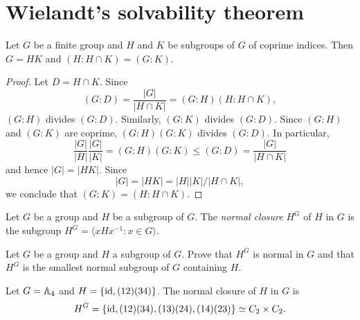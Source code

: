 
\section{Wielandt's solvability theorem}

\begin{lemma}
	\label{lemma:4Wielandt}
	Let $G$ be a finite group and $H$ and $K$ be subgroups of $G$ 
        of coprime indices. Then $G=HK$ and $(H:H\cap K)=(G:K)$.
\end{lemma}

\begin{proof}
	Let $D=H\cap K$. Since 
	\[
	(G:D)=\frac{|G|}{|H\cap K|}=(G:H)(H:H\cap K),
	\]
	$(G:H)$ divides $(G:D)$. Similarly, $(G:K)$ divides 
	$(G:D)$. Since $(G:H)$ and $(G:K)$ are coprime, $(G:H)(G:K)$
	divides $(G:D)$. In particular, 
	\[
	\frac{|G|}{|H|}\frac{|G|}{|K|}=(G:H)(G:K)\leq (G:D)=\frac{|G|}{|H\cap K|} 
	\]
	and hence $|G|=|HK|$. Since 
 \[
 |G|=|HK|=|H||K|/|H\cap K|,
 \]
 we conclude that 
	$(G:K)=(H:H\cap K)$.
\end{proof}

\begin{definition}
Let $G$ be a group and $H$ be a subgroup of $G$. The 
\emph{normal closure} $H^G$ of $H$ in $G$ is the subgroup 
$H^G=\langle xHx^{-1}:x\in G\rangle$.
\end{definition}

\begin{exercise}
Let $G$ be a group and $H$ a subgroup of $G$. Prove that $H^G$ is normal in $G$ and that 
$H^G$ is the smallest normal subgroup of $G$ containing $H$. 
\end{exercise}


\begin{example}
Let $G=\mathbb{A}_4$ and $H=\{\operatorname{id},(12)(34)\}$. The normal closure of $H$ in $G$
is 
 \[
 H^G=\{\operatorname{id},(12)(34),(13)(24),(14)(23)\}\simeq C_2\times C_2.
 \]
\end{example}

